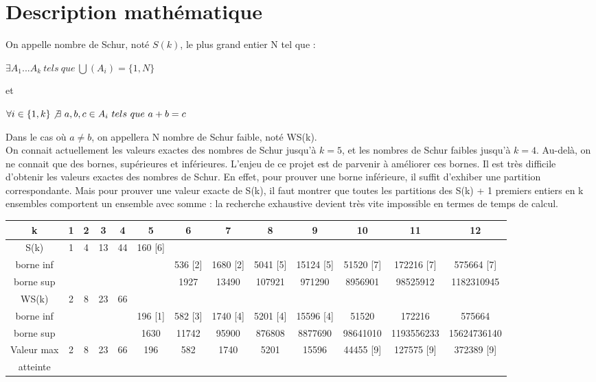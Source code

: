 \documentclass{report}
\begin{document}
\section{Description mathématique}
On appelle nombre de Schur, noté $S(k)$, le plus grand entier N tel que :
\begin{center}
    
$ \exists A_1... A_k \ tels \ que \ \bigcup(A_i) = \{1,N\} $

et

$\forall i\in \{1,k\} \not\exists \ a,b,c\in A_i \ tels \  que \ a+b=c  $

\end{center}
Dans le cas où $a \neq b$, on appellera N nombre de Schur faible, noté WS(k).
\\
On connait actuellement les valeurs exactes des nombres de Schur jusqu'à $k = 5$, et les nombres de Schur faibles jusqu'à $k = 4$. Au-delà, on ne connait que des bornes, supérieures et inférieures. L'enjeu de ce projet est de parvenir à améliorer ces bornes. Il est très difficile d'obtenir les valeurs exactes des nombres de Schur. En effet, pour prouver une borne inférieure, il suffit d'exhiber une partition correspondante. Mais pour prouver une valeur exacte de S(k), il faut montrer que toutes les partitions des S(k) + 1 premiers entiers en k ensembles comportent un ensemble avec somme : la recherche exhaustive devient très vite impossible en termes de temps de calcul.
\\


\begin{tabular}{c|c|c|c|c|c|c|c|c|c|c|c|c}
    \hline
    k & 1 & 2 & 3 & 4 & 5 & 6 & 7 & 8 & 9 & 10 & 11 & 12 \\ \hline
    S(k) & 1 & 4 & 13 & 44 & 160 [6] &  &  &  &  &  &  & \\
    borne inf &  &  &  &  &  & 536 [2] & 1680 [2] & 5041 [5] & 15124 [5] & 51520 [7] & 172216 [7] & 575664 [7] \\ 
    borne sup &  &  &  &  &  & 1927 & 13490 & 107921 & 971290 & 8956901 & 98525912 & 1182310945 \\ \hline
    WS(k) & 2 & 8 & 23 & 66 &  &  &  &  &  &  &  &  \\ 
    borne inf &  &  &  &  & 196 [1] & 582 [3] & 1740 [4] & 5201 [4] & 15596 [4] & 51520 & 172216 & 575664 \\
    borne sup &  &  &  &  & 1630 & 11742 & 95900 & 876808 & 8877690 & 98641010 & 1193556233 & 15624736140 \\ \hline
    
    Valeur max & 2 & 8 & 23 & 66 & 196 & 582 & 1740 & 5201 & 15596 & 44455 [9] & 127575 [9] & 372389 [9] \\ 
    atteinte &  &  &  &  &  &  &  &  &  &  &  &  \\ \hline
    
\end{tabular}
\\
\end{document}
